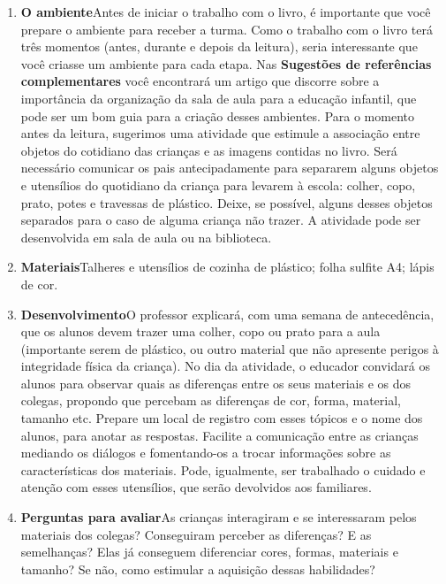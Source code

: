 \documentclass[11pt]{extarticle}
\begin{document}
\begin{enumerate}
\item \textbf{O ambiente}\quad Antes de iniciar o trabalho com o livro, é importante que você 
prepare o ambiente para receber a turma. Como o trabalho com o livro terá 
três momentos (antes, durante e depois da leitura), seria interessante que você 
criasse um ambiente para cada etapa. Nas \textbf{Sugestões de referências complementares} 
você encontrará um artigo que discorre sobre a importância da organização da sala 
de aula para a educação infantil, que pode ser um bom guia para a criação desses 
ambientes.
Para o momento antes da leitura, sugerimos uma atividade que estimule a
associação entre  objetos do cotidiano das crianças e as imagens contidas no livro. Será necessário comunicar os pais antecipadamente para separarem alguns objetos e utensílios do quotidiano da criança para levarem à escola: colher, copo, prato, potes e travessas de plástico. Deixe, se possível, alguns desses objetos separados para o caso de alguma criança não trazer. A atividade pode ser desenvolvida em sala de aula ou na biblioteca.


\item \textbf{Materiais}\quad Talheres e utensílios de cozinha de plástico; folha sulfite A4; lápis de cor.

\item \textbf{Desenvolvimento}\quad O professor explicará, com uma semana de antecedência, que os alunos devem trazer uma colher, copo ou prato para a aula (importante serem de plástico, ou outro material que não apresente perigos à integridade física da criança). No dia da atividade, o educador convidará os alunos para observar quais as diferenças entre os seus materiais e os dos colegas, propondo que percebam as diferenças de cor, forma, material,  tamanho etc. Prepare um local de registro com esses tópicos e o nome dos alunos, para anotar as respostas. Facilite a comunicação entre as crianças mediando os diálogos e fomentando-os a trocar informações sobre as características dos materiais. Pode, igualmente, ser trabalhado o cuidado e atenção com esses utensílios, que serão devolvidos aos familiares.

\item \textbf{Perguntas para avaliar}\quad As crianças interagiram e se interessaram pelos materiais dos colegas? Conseguiram perceber as diferenças? E as semelhanças? Elas já conseguem diferenciar cores, formas, materiais e tamanho? Se não, como estimular a aquisição dessas habilidades? 

\end{enumerate}
\end{document}
